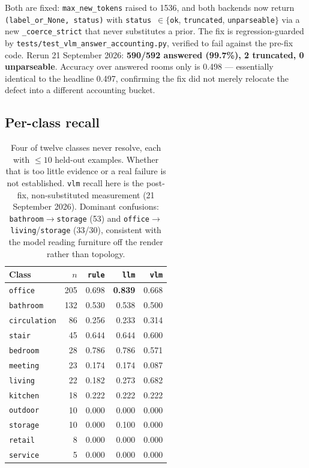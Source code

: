 \documentclass[11pt,a4paper]{article}
\newcommand{\code}[1]{\texttt{\small #1}}
\begin{document}
Both are fixed: \code{max\_new\_tokens} raised to 1536, and both backends now
return \code{(label\_or\_None, status)} with
\code{status}~$\in\{$\code{ok}, \code{truncated}, \code{unparseable}$\}$ via a
new \code{\_coerce\_strict} that never substitutes a prior. The fix is
regression-guarded by \code{tests/test\_vlm\_answer\_accounting.py}, verified
to fail against the pre-fix code. Rerun 21 September 2026:
\textbf{590/592 answered (99.7\%), 2 truncated, 0 unparseable}. Accuracy over
answered rooms only is 0.498 --- essentially identical to the headline 0.497,
confirming the fix did not merely relocate the defect into a different
accounting bucket.

\subsection{Per-class recall}

\begin{table}[ht]
\centering
\small
\begin{tabular}{lrrrr}
\toprule
Class & $n$ & \code{rule} & \code{llm} & \code{vlm} \\
\midrule
\code{office}      & 205 & 0.698 & \textbf{0.839} & 0.668 \\
\code{bathroom}    & 132 & 0.530 & 0.538 & 0.500 \\
\code{circulation} &  86 & 0.256 & 0.233 & 0.314 \\
\code{stair}       &  45 & 0.644 & 0.644 & 0.600 \\
\code{bedroom}     &  28 & 0.786 & 0.786 & 0.571 \\
\code{meeting}     &  23 & 0.174 & 0.174 & 0.087 \\
\code{living}      &  22 & 0.182 & 0.273 & 0.682 \\
\code{kitchen}     &  18 & 0.222 & 0.222 & 0.222 \\
\code{outdoor}     &  10 & 0.000 & 0.000 & 0.000 \\
\code{storage}     &  10 & 0.000 & 0.100 & 0.000 \\
\code{retail}      &   8 & 0.000 & 0.000 & 0.000 \\
\code{service}     &   5 & 0.000 & 0.000 & 0.000 \\
\bottomrule
\end{tabular}
\caption{Four of twelve classes never resolve, each with $\le 10$ held-out
examples. Whether that is too little evidence or a real failure is not
established. \code{vlm} recall here is the post-fix, non-substituted
measurement (21 September 2026). Dominant confusions:
\code{bathroom}$\to$\code{storage} (53) and
\code{office}$\to$\code{living}/\code{storage} (33/30), consistent with the
model reading furniture off the render rather than topology.}
\end{table}
\end{document}
